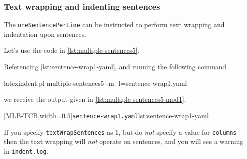 \subsubsection{Text wrapping and indenting sentences}
 The \texttt{oneSentencePerLine}  can be instructed to perform text wrapping and indentation upon sentences.

 \begin{example}
 Let's use the code in \cref{lst:multiple-sentences5}.


 Referencing \cref{lst:sentence-wrap1-yaml}, and running the following command
  

 \begin{commandshell}
latexindent.pl multiple-sentences5 -m -l=sentence-wrap1.yaml
\end{commandshell}

 we receive the output given in \cref{lst:multiple-sentences5-mod1}.

 \begin{cmhtcbraster}[ raster left skip=-3.5cm,
   raster right skip=-2cm,
   raster force size=false,
   raster column 1/.style={add to width=.1\textwidth},
   raster column skip=.06\linewidth]
  [MLB-TCB,width=0.5\textwidth]{\texttt{sentence-wrap1.yaml}}{lst:sentence-wrap1-yaml}
 \end{cmhtcbraster}
 \end{example}

 If you specify \texttt{textWrapSentences} as 1, but do \emph{not} specify a value for
 \texttt{columns} then the text wrapping will \emph{not} operate on sentences, and you
 will see a warning in \texttt{indent.log}.

